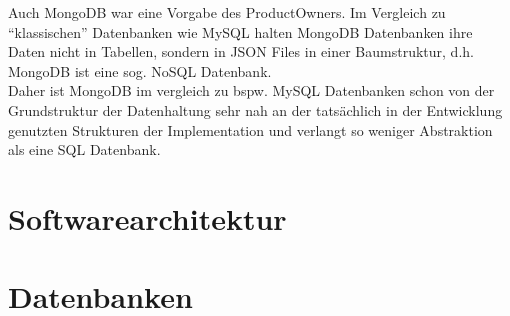 Auch MongoDB war eine Vorgabe des ProductOwners.
Im Vergleich zu “klassischen” Datenbanken wie MySQL halten MongoDB Datenbanken ihre Daten nicht in Tabellen, sondern in JSON Files in einer Baumstruktur, d.h. MongoDB ist eine sog. NoSQL Datenbank. \\
Daher ist MongoDB im vergleich zu bspw. MySQL Datenbanken schon von der Grundstruktur der Datenhaltung sehr nah an der tatsächlich in der Entwicklung genutzten Strukturen der Implementation und verlangt so weniger Abstraktion als eine SQL Datenbank.

\section{Softwarearchitektur}

\section{Datenbanken}